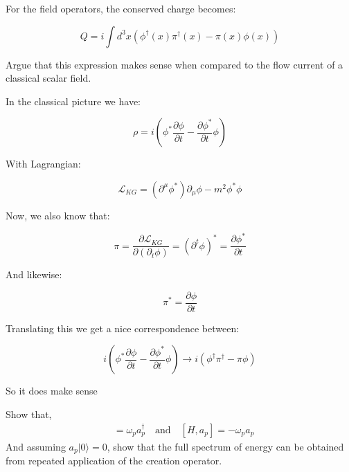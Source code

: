 \documentclass[working, oneside]{../../Preambles/tuftebook}
\begin{document}
\begin{exercise}[8]
For the field operators, the conserved charge becomes:

\[
Q = i \int d^3x \left( \phi^\dagger(x) \pi^\dagger(x) - \pi(x) \phi(x) \right)
\]

Argue that this expression makes sense when compared to the flow current of a classical scalar field.
\end{exercise}

\begin{solution} In the classical picture we have:

\[
\rho = i \left( \phi^* \frac{\partial \phi}{\partial t} - \frac{\partial \phi^*}{\partial t} \phi \right)
\]

With Lagrangian:

\[
\mathcal{L}_{KG} = (\partial^\mu \phi^*) \partial_\mu \phi - m^2 \phi^* \phi
\]

Now, we also know that:

\[
\pi = \frac{\partial \mathcal{L}_{KG}}{\partial (\partial_t \phi)} = (\partial^t \phi)^* = \frac{\partial \phi^*}{\partial t}
\]

And likewise:

\[
\pi^* = \frac{\partial \phi}{\partial t}
\]

Translating this we get a nice correspondence between:

\[
i \left( \phi^* \frac{\partial \phi}{\partial t} - \frac{\partial \phi^*}{\partial t} \phi \right) \rightarrow i \left( \phi^\dagger \pi^\dagger - \pi \phi \right)
\]

So it does make sense

\end{solution}
\begin{exercise}[2.9]
Show that,
\begin{align*}
    [H, a_p^\dagger] &= \omega_p a_p^\dagger \quad \text{and} \quad [H, a_p] = -\omega_p a_p
\end{align*}
And assuming $a_p |0\rangle = 0$, show that the full spectrum of energy can be obtained from repeated application of the creation operator.
\end{exercise}
\end{document}

